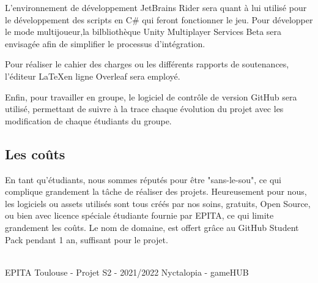 L’environnement de développement JetBrains Rider sera quant à lui utilisé pour le développement des scripts en C\# qui feront fonctionner le jeu. Pour développer le mode multijoueur,la bilbliothèque Unity Multiplayer Services Beta sera envisagée afin de simplifier le processus d'intégration.


Pour réaliser le cahier des charges ou les différents rapports de soutenances, l'éditeur \LaTeX  en ligne Overleaf sera employé.


Enfin, pour travailler en groupe, le logiciel de contrôle de version GitHub sera utilisé, permettant de suivre à la trace chaque évolution du projet avec les modification de chaque étudiants du groupe.

\subsection{Les coûts}
En tant qu'étudiants, nous sommes réputés pour être "sans-le-sou", ce qui complique grandement la tâche de réaliser des projets. Heureusement pour nous, les logiciels ou assets utilisés sont tous créés par nos soins, gratuits, Open Source, ou bien avec licence spéciale étudiante fournie par EPITA, ce qui limite grandement les coûts.
Le nom de domaine, est offert grâce au GitHub Student Pack pendant 1 an, suffisant pour le projet.

\vfill
\noindent\makebox[\linewidth]{\rule{.8\paperwidth}{.6pt}}\\[0.2cm]
EPITA Toulouse - Projet S2 - 2021/2022 \hfill Nyctalopia - gameHUB
\noindent\makebox[\linewidth]{\rule{.8\paperwidth}{.6pt}}

\newpage